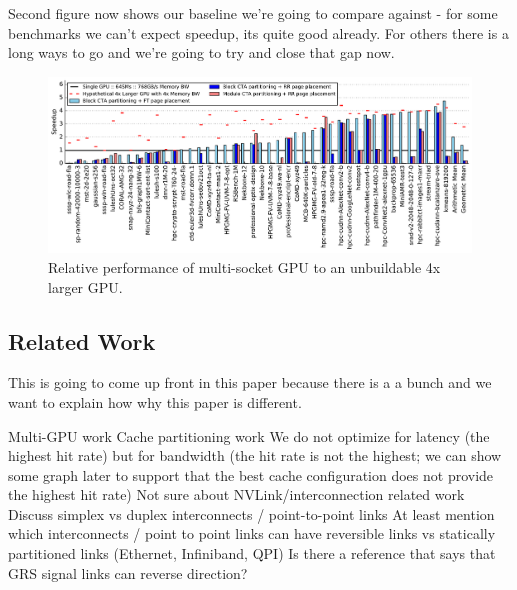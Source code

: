 Second figure now shows our baseline we're going to compare against - for some benchmarks we can't expect speedup, its quite good already.
For others there is a long ways to go and we're going to try and close that gap now.

\begin{figure}[tp]
    \centering
    \includegraphics[width=1\linewidth]{figures/plot_different_baselines.pdf}
    \caption{Relative performance of multi-socket GPU to an unbuildable 4x larger GPU.}
    \label{fig:motivation2}
\end{figure}

\subsection{Related Work}

This is going to come up front in this paper because there is a a bunch and we want to explain how
why this paper is different.

Multi-GPU work
Cache partitioning work
We do not optimize for latency (the highest hit rate) but for bandwidth (the hit rate is not the highest; we can show some graph later to support that the best cache configuration does not provide the highest hit rate)
Not sure about NVLink/interconnection related work
Discuss simplex vs duplex interconnects / point-to-point links
At least mention which interconnects / point to point links can have reversible links vs statically partitioned links (Ethernet, Infiniband, QPI)
Is there a reference that says that GRS signal links can reverse direction?


